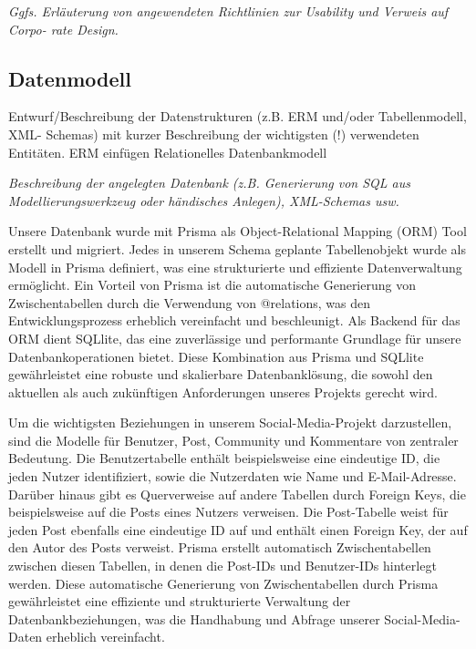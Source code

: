 \documentclass[a4paper,12pt]{article}
\begin{document}
\textit{
Ggfs. Erläuterung von angewendeten Richtlinien zur Usability und Verweis auf
Corpo- rate Design.}

\subsection{Datenmodell}
Entwurf/Beschreibung der Datenstrukturen (z.B. ERM
und/oder Tabellenmodell, XML- Schemas) mit kurzer Beschreibung der wichtigsten
(!) verwendeten Entitäten. ERM einfügen
Relationelles Datenbankmodell

\textit{Beschreibung der angelegten Datenbank (z.B. Generierung von SQL aus Modellierungswerkzeug oder händisches Anlegen), XML-Schemas usw.}

Unsere Datenbank wurde mit Prisma als Object-Relational Mapping (ORM) Tool erstellt und migriert. Jedes in unserem Schema geplante Tabellenobjekt wurde als Modell in Prisma definiert, was eine strukturierte und effiziente Datenverwaltung ermöglicht. Ein Vorteil von Prisma ist die automatische Generierung von Zwischentabellen durch die Verwendung von @relations, was den Entwicklungsprozess erheblich vereinfacht und beschleunigt. Als Backend für das ORM dient SQLlite, das eine zuverlässige und performante Grundlage für unsere Datenbankoperationen bietet. Diese Kombination aus Prisma und SQLlite gewährleistet eine robuste und skalierbare Datenbanklösung, die sowohl den aktuellen als auch zukünftigen Anforderungen unseres Projekts gerecht wird.

Um die wichtigsten Beziehungen in unserem Social-Media-Projekt darzustellen, sind die Modelle für Benutzer, Post, Community und Kommentare von zentraler Bedeutung. Die Benutzertabelle enthält beispielsweise eine eindeutige ID, die jeden Nutzer identifiziert, sowie die Nutzerdaten wie Name und E-Mail-Adresse. Darüber hinaus gibt es Querverweise auf andere Tabellen durch Foreign Keys, die beispielsweise auf die Posts eines Nutzers verweisen. Die Post-Tabelle weist für jeden Post ebenfalls eine eindeutige ID auf und enthält einen Foreign Key, der auf den Autor des Posts verweist. Prisma erstellt automatisch Zwischentabellen zwischen diesen Tabellen, in denen die Post-IDs und Benutzer-IDs hinterlegt werden. Diese automatische Generierung von Zwischentabellen durch Prisma gewährleistet eine effiziente und strukturierte Verwaltung der Datenbankbeziehungen, was die Handhabung und Abfrage unserer Social-Media-Daten erheblich vereinfacht.
\end{document}
